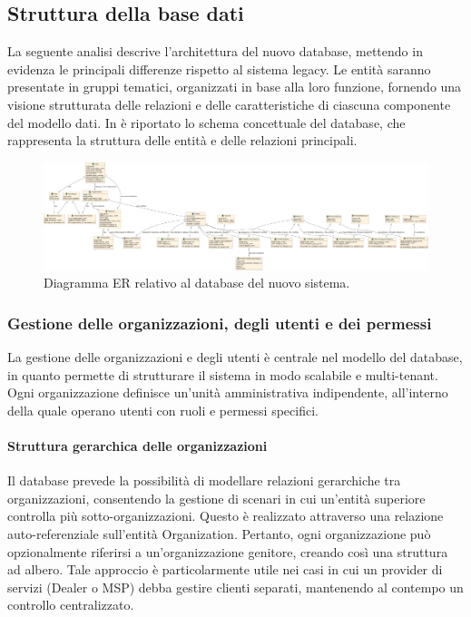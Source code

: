 \subsection{Struttura della base dati}
La seguente analisi descrive l'architettura del nuovo database, mettendo in evidenza le principali differenze rispetto al sistema legacy. Le entità saranno presentate in gruppi tematici, organizzati in base alla loro funzione, fornendo una visione strutturata delle relazioni e delle caratteristiche di ciascuna componente del modello dati. In  è riportato lo schema concettuale del database, che rappresenta la struttura delle entità e delle relazioni principali.

\begin{figure}
  \centering
  \includegraphics[width=1\textwidth]{figures/new_database_schema.pdf}
  \caption{Diagramma ER relativo al database del nuovo sistema.}
  \label{fig:database-schema}
\end{figure}

\subsubsection{Gestione delle organizzazioni, degli utenti e dei permessi}
La gestione delle organizzazioni e degli utenti è centrale nel modello del database, in quanto permette di strutturare il sistema in modo scalabile e multi-tenant. Ogni organizzazione definisce un'unità amministrativa indipendente, all'interno della quale operano utenti con ruoli e permessi specifici.

\paragraph{Struttura gerarchica delle organizzazioni}
Il database prevede la possibilità di modellare relazioni gerarchiche tra organizzazioni, consentendo la gestione di scenari in cui un'entità superiore controlla più sotto-organizzazioni. Questo è realizzato attraverso una relazione auto-referenziale sull'entità Organization. Pertanto, ogni organizzazione può opzionalmente riferirsi a un'organizzazione genitore, creando così una struttura ad albero. Tale approccio è particolarmente utile nei casi in cui un provider di servizi (Dealer o MSP) debba gestire clienti separati, mantenendo al contempo un controllo centralizzato.

